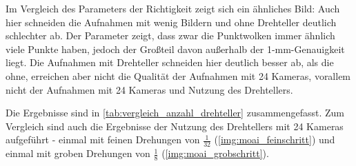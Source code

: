 \documentclass[./00PhotoBox.tex]{subfiles}
\begin{document}
Im Vergleich des Parameters der Richtigkeit zeigt sich ein ähnliches Bild: Auch hier schneiden die Aufnahmen mit wenig Bildern und ohne Drehteller deutlich schlechter ab. Der Parameter zeigt, dass zwar die Punktwolken immer ähnlich viele Punkte haben, jedoch der Großteil davon außerhalb der 1-mm-Genauigkeit liegt. Die Aufnahmen mit Drehteller schneiden hier deutlich besser ab, als die ohne, erreichen aber nicht die Qualität der Aufnahmen mit 24 Kameras, vorallem nicht der Aufnahmen mit 24 Kameras und Nutzung des Drehtellers.

Die Ergebnisse sind in \autoref{tab:vergleich_anzahl_drehteller} zusammengefasst. Zum Vergleich sind auch die Ergebnisse der Nutzung des Drehtellers mit 24 Kameras aufgeführt - einmal mit feinen Drehungen von $\frac{1}{32}$ (\autoref{img:moai_feinschritt}) und einmal mit groben Drehungen von $\frac{1}{8}$ (\autoref{img:moai_grobschritt}).
\end{document}
